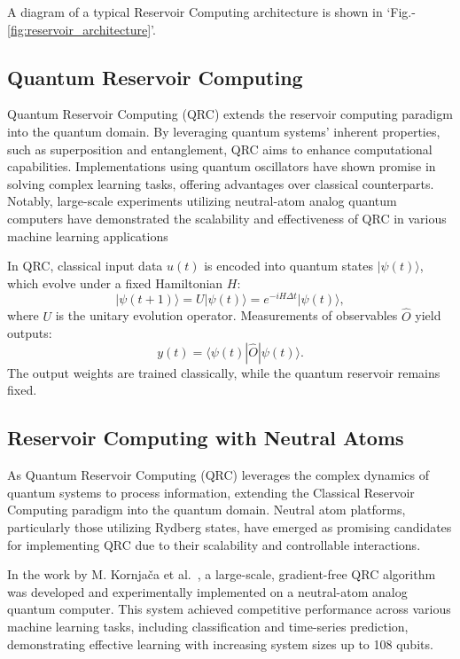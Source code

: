 \documentclass[conference]{IEEEtran}
\begin{document}
A diagram of a typical Reservoir Computing architecture is shown in `Fig.-\ref{fig:reservoir_architecture}'.




\subsection{Quantum Reservoir Computing}
Quantum Reservoir Computing (QRC) extends the reservoir 
computing paradigm into the quantum domain. By leveraging quantum systems' 
inherent properties, such as superposition and entanglement, QRC aims 
to enhance computational capabilities. Implementations using quantum 
oscillators have shown promise in solving complex learning tasks, 
offering advantages over classical counterparts. Notably, large-scale 
experiments utilizing neutral-atom analog quantum computers have demonstrated 
the scalability and effectiveness of QRC in various machine learning applications~\cite{kornjavcaLargescaleQuantumReservoir2024}


In QRC, classical input data \( u(t) \) is encoded into quantum states \( |\psi(t)\rangle \),
which evolve under a fixed Hamiltonian \( H \):
\begin{equation}
    |\psi(t+1)\rangle = U |\psi(t)\rangle = e^{-iH\Delta t} |\psi(t)\rangle,
\end{equation}
where \( U \) is the unitary evolution operator. Measurements of observables \( \hat{O} \) yield outputs:
\begin{equation}
    y(t) = \langle \psi(t) | \hat{O} | \psi(t) \rangle.
\end{equation}
The output weights are trained classically, while the quantum reservoir remains fixed.

\subsection{Reservoir Computing with Neutral Atoms}
As Quantum Reservoir Computing (QRC) leverages the complex 
dynamics of quantum systems to process information, 
extending the Classical Reservoir Computing 
paradigm into the quantum domain. Neutral atom platforms, 
particularly those utilizing Rydberg states, 
have emerged as promising candidates for implementing 
QRC due to their scalability and controllable interactions.

In the work by M. Kornjača et al.~\cite{kornjavcaLargescaleQuantumReservoir2024}, 
a large-scale, gradient-free QRC algorithm was 
developed and experimentally implemented on a 
neutral-atom analog quantum computer. 
This system achieved competitive performance across 
various machine learning tasks, 
including classification and time-series prediction, 
demonstrating effective learning with increasing system 
sizes up to 108 qubits.
\end{document}

